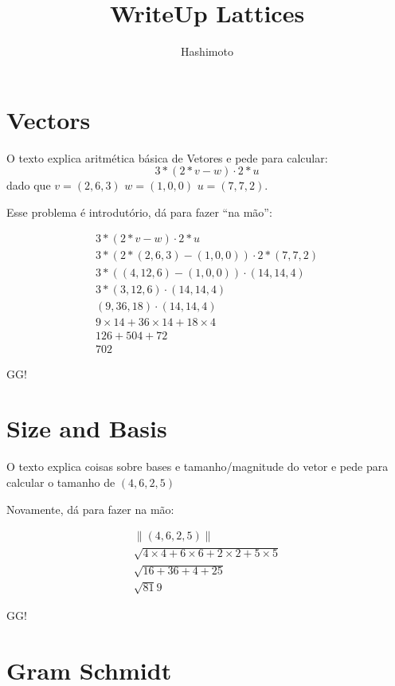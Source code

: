 \documentclass{article}
\begin{document}
\title{WriteUp Lattices}
\author{Hashimoto}
\date{}
\maketitle

\section{Vectors}

O texto explica aritmética básica de Vetores
e pede para calcular:
\[
    3 * ( 2 * v - w ) \cdot 2 * u
\]
dado que 
\(
    v = (2, 6, 3)
\) \quad \(
    w = (1, 0, 0)
\) \quad \(
    u = (7, 7, 2)
\).

Esse problema é introdutório,
dá para fazer ``na mão'':

\begin{gather*}
    3 * ( 2 * v - w ) \cdot 2 * u \\
    3 * ( 2 * (2, 6, 3) - (1, 0, 0) ) \cdot 2 * (7, 7, 2) \\
    3 * ( (4, 12, 6) - (1, 0, 0) ) \cdot (14, 14, 4) \\
    3 * (3, 12, 6) \cdot (14, 14, 4) \\
    (9, 36, 18) \cdot (14, 14, 4) \\
    9 \times 14 + 36 \times 14 + 18 \times 4 \\
    126 + 504 + 72 \\
    702
\end{gather*}

GG!

\section{Size and Basis}

O texto explica coisas sobre bases e tamanho/magnitude do vetor
e pede para calcular o tamanho de
\(
    (4, 6, 2, 5)
\)

Novamente, dá para fazer na mão:

\begin{gather*}
    \| (4, 6, 2, 5) \| \\
    \sqrt{ 4 \times 4 + 6 \times 6 + 2 \times 2 + 5 \times 5 } \\
    \sqrt{ 16 + 36 + 4 + 25 } \\
    \sqrt{ 81 }
    9
\end{gather*}

GG!

\section{Gram Schmidt}
\end{document}
